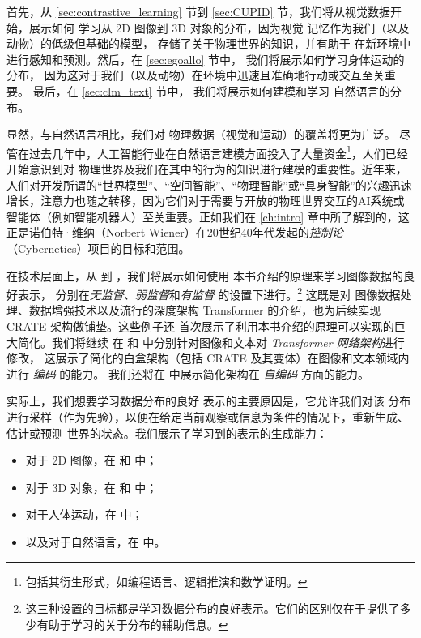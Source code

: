 \documentclass[../../book-main_zh.tex]{subfiles}
\begin{document}
首先，从 \ref{sec:contrastive_learning} 节到
\ref{sec:CUPID} 节，我们将从视觉数据开始，展示如何
学习从 2D 图像到 3D 对象的分布，因为视觉
记忆作为我们（以及动物）的低级但基础的模型，
存储了关于物理世界的知识，并有助于
在新环境中进行感知和预测。然后，在 \ref{sec:egoallo} 节中，
我们将展示如何学习身体运动的分布，
因为这对于我们（以及动物）在环境中迅速且准确地行动或交互至关重要。
最后，在 \ref{sec:clm_text} 节中，
我们将展示如何建模和学习
自然语言的分布。

显然，与自然语言相比，我们对
物理数据（视觉和运动）的覆盖将更为广泛。
尽管在过去几年中，人工智能行业在自然语言建模方面投入了大量资金\footnote{包括其衍生形式，如编程语言、逻辑推演和数学证明。}，人们已经开始意识到对
物理世界及我们在其中的行为的知识进行建模的重要性。近年来，人们对开发所谓的“世界模型”、“空间智能”、“物理智能”或“具身智能”的兴趣迅速增长，注意力也随之转移，因为它们对于需要与开放的物理世界交互的AI系统或智能体（例如智能机器人）至关重要。正如我们在 \ref{ch:intro} 章中所了解到的，这正是诺伯特·维纳（Norbert Wiener）在20世纪40年代发起的{\em 控制论}（Cybernetics）项目的目标和范围。  

在技术层面上，从  到
，我们将展示如何使用
本书介绍的原理来学习图像数据的良好表示，
分别在{\em 无监督、弱监督}和{\em 有监督}
的设置下进行。\footnote{这三种设置的目标都是学习数据分布的良好表示。它们的区别仅在于提供了多少有助于学习的关于分布的辅助信息。} 这既是对
图像数据处理、数据增强技术以及流行的深度架构 Transformer 的介绍，也为后续实现 CRATE 架构做铺垫。这些例子还
首次展示了利用本书介绍的原理可以实现的巨大简化。我们将继续
在  和  中分别针对图像和文本对 \textit{Transformer 网络架构}进行修改，
这展示了简化的白盒架构（包括 CRATE 及其变体）在图像和文本领域内进行 \textit{编码} 的能力。
我们还将在  中展示简化架构在 \textit{自编码} 方面的能力。 %

实际上，我们想要学习数据分布的良好
表示的主要原因是，它允许我们对该
分布进行采样（作为先验），以便在给定当前观察或信息为条件的情况下，重新生成、估计或预测
世界的状态。我们展示了学习到的表示的生成能力：
\begin{itemize}
\item 对于 2D 图像，在  和
 中；
\item 对于 3D 对象，在
 和  中； 
\item 对于人体运动，在  中；
\item 以及对于自然语言，在  中。
\end{itemize} 
\end{document}
